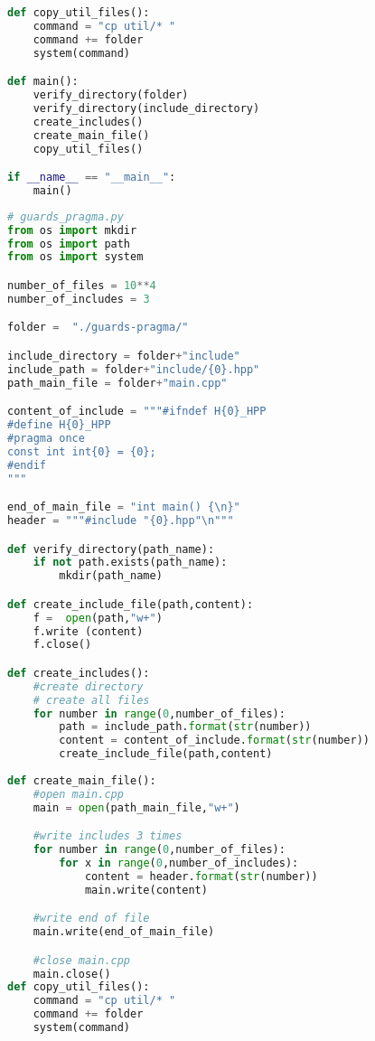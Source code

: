 \begin{apendicesenv}
\begin{lstlisting}[language=Python,caption={
              Script Guardas de Inclusão Interna},
                     label=script_intenal_include]
def copy_util_files():                                                           
    command = "cp util/* "                                                       
    command += folder                                                            
    system(command)      

def main():
    verify_directory(folder)
    verify_directory(include_directory)
    create_includes()
    create_main_file()
    copy_util_files()

if __name__ == "__main__":
    main()
\end{lstlisting}

\begin{lstlisting}[language=Python, caption={
Script Guardas de Inclusão Interna primeiro que \textit{Pragma Once}},
                   label=script_guards_pragma_include]
# guards_pragma.py
from os import mkdir
from os import path
from os import system

number_of_files = 10**4
number_of_includes = 3

folder =  "./guards-pragma/"

include_directory = folder+"include"
include_path = folder+"include/{0}.hpp"
path_main_file = folder+"main.cpp"

content_of_include = """#ifndef H{0}_HPP
#define H{0}_HPP
#pragma once
const int int{0} = {0};
#endif
"""

end_of_main_file = "int main() {\n}"
header = """#include "{0}.hpp"\n"""

def verify_directory(path_name):
    if not path.exists(path_name):
        mkdir(path_name)

def create_include_file(path,content):
    f =  open(path,"w+")
    f.write (content)
    f.close()

def create_includes():
    #create directory
    # create all files
    for number in range(0,number_of_files):
        path = include_path.format(str(number))
        content = content_of_include.format(str(number))
        create_include_file(path,content)
    
def create_main_file():
    #open main.cpp
    main = open(path_main_file,"w+")

    #write includes 3 times
    for number in range(0,number_of_files):
        for x in range(0,number_of_includes):
            content = header.format(str(number))
            main.write(content)

    #write end of file
    main.write(end_of_main_file)

    #close main.cpp
    main.close()
def copy_util_files():                                                           
    command = "cp util/* "                                                       
    command += folder                                                            
    system(command)                                                              
                    


\end{lstlisting}
\end{apendicesenv}
